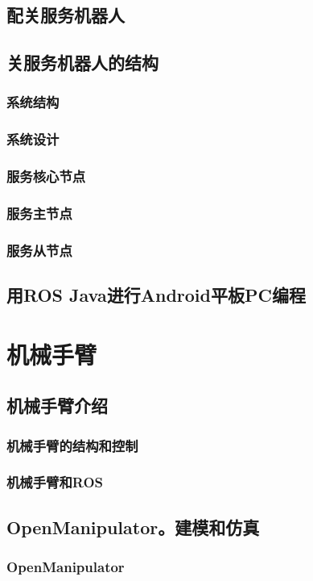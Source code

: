 \documentclass[geye,green,kindle,cn]{elegantnote}
\begin{document}
\subsection{配关服务机器人}
\subsection{关服务机器人的结构}
\subsubsection{系统结构}
\subsubsection{系统设计}
\subsubsection{服务核心节点}
\subsubsection{服务主节点}
\subsubsection{服务从节点}
\subsection{用ROS Java进行Android平板PC编程}
\section{机械手臂}
\subsection{机械手臂介绍}
\subsubsection{机械手臂的结构和控制}
\subsubsection{机械手臂和ROS}
\subsection{OpenManipulator。建模和仿真}
\subsubsection{OpenManipulator}
\end{document}

